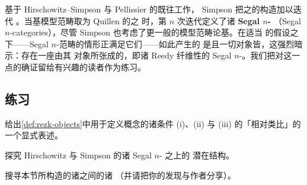基于 Hirschowitz–Simpson \cite{bib56} 与 Pellissier \cite{bib90} 的既往工作，
Simpson 把\trSegalCategories{}之\trModelStructure{}的构造加以迭代
\cite[\S19.2-4]{bib116}。当基模型范畴取为 Quillen 的\trKanComplex{}之%
\trModelStructure{}时，第 $n$ 次迭代定义了诸 \textbf{Segal $n$-\trCategory}
（Segal $n$-categories），尽管 Simpson 也考虑了更一般的模型范畴论基。在适当
的假设之下——Segal $n$-范畴的情形正满足它们——如此产生的\trModelStructure{}%
是\trCartesianClosed{}且一切对象皆\trCofibrant，这强烈暗示：存在一座由其%
\trFibrant{}对象所张成的\trInfinityCosmos，即诸 Reedy 纤维性的 Segal
$n$-\trCategory。我们把对这一点的确证留给有兴趣的读者作为练习。

\subsection*{练习}

\begin{exercise}\label{ex:rezk-isofibration-formulation}
给出\cref{def:rezk-objects}中用于定义\trRezkIsofibration{}概念的诸条件 (i)、(ii)
与 (iii) 的「相对类比」的一个显式表述。
\end{exercise}

\begin{exercise}\label{ex:segal-n-category-cosmos}
探究 Hirschowitz 与 Simpson 的诸 Segal $n$-\trCategory{} \cite{bib56} 之上的
潜在\trInfinityCosmos{}结构。
\end{exercise}

\begin{exercise}\label{ex:cosmological-biequivalence-search}
搜寻本节所构造的诸\trInfinityCosmos{}之间的诸\trCosmologicalBiequivalence
（并请把你的发现与作者分享）。
\end{exercise}

